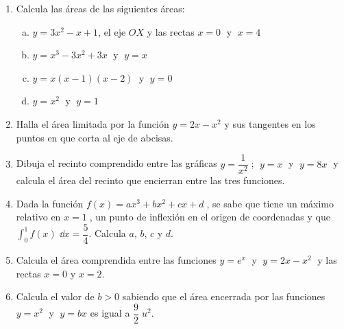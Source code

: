 \begin{enumerate}
	
\item Calcula las áreas de las siguientes áreas: 
	\begin{enumerate}[a) ]
	\item $y=3x^2-x+1$, el eje $OX$ y las rectas $x=0\; $ y $\; x=4$ 
	\item $y=x^3-3x^2+3x\; $ y $\; y=x$
	\item $y=x(x-1)(x-2)\;$ y $\; y=0$
	\item $y=x^2\;$ y $\; y=1$
	\end{enumerate}

\rightline{\textcolor{gris}{Solución: $a)\quad 60\;u^2; \qquad b) \quad 1/2\; u^2; \qquad c) 	\quad 1/2\; u^2; \; \qquad d) \quad 4/3 \; u^2$}}

\item Halla el área limitada por la función $y=2x-x^2$ y sus tangentes en los puntos en que corta al eje de abcisas.


\item Dibuja el recinto comprendido entre las gráficas $y=\dfrac 1 {x^2}\; $; $\; y=x\;$ y $\; y=8x\; $ y calcula el área del recinto que encierran entre las tres funciones.

\rightline{\textcolor{gris}{Solución: $3/2 \; u^2$ }}

\item Dada la función $f(x)=ax^3+bx^2+cx+d\;$, se sabe que tiene un máximo relativo en $x=1\; $, un punto de inflexión en el origen de coordenadas y que $\displaystyle \int_0^1 f(x)\; \dd x = \dfrac 5 4 $. Calcula $a$, $b$, $c$ y $d$.

\rightline{\textcolor{gris}{Solución: $d=0; \; b=0; \; a=-1; \; c=3  \; \to \;  f(x)=-x^3+3x$ }}	

\item Calcula el área comprendida entre las funciones $y=e^x\; $ y $\; y=2x-x^2\;$ y las rectas $x=0$ y $x=2$.

\rightline{\textcolor{gris}{Solución: $(e^2-7/3)\; u^2$ }}

\item Calcula el valor de $b>0$ sabiendo que el área encerrada por las funciones $y=x^2\;$ y $\; y=bx$ es igual a $\dfrac 9 2 \; u^2$.

\rightline{\textcolor{gris}{Solución: $b=3$ }}


\end{enumerate}
